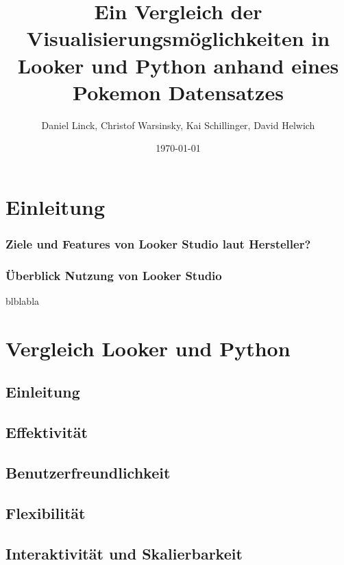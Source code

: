 \documentclass[12pt]{article}
\begin{document}
	\title{Ein Vergleich der Visualisierungsmöglichkeiten in Looker und Python anhand eines Pokemon Datensatzes}
	\author{Daniel Linck, Christof Warsinsky, Kai Schillinger, David Helwich}
	\date{\today}
	
	\maketitle
	
	\newpage
	
	\tableofcontents
	
	\newpage
	
	\section{Einleitung}
	
	\subsubsection{Ziele und Features von Looker Studio laut Hersteller?}
	
	\subsubsection{Überblick Nutzung von Looker Studio}
	blblabla
	
	\section{Vergleich Looker und Python}
	\subsection{Einleitung}
	
	\subsection{Effektivität}
	
	\subsection{Benutzerfreundlichkeit}
	
	\subsection{Flexibilität}

	\subsection{Interaktivität und Skalierbarkeit}
 
\end{document}
